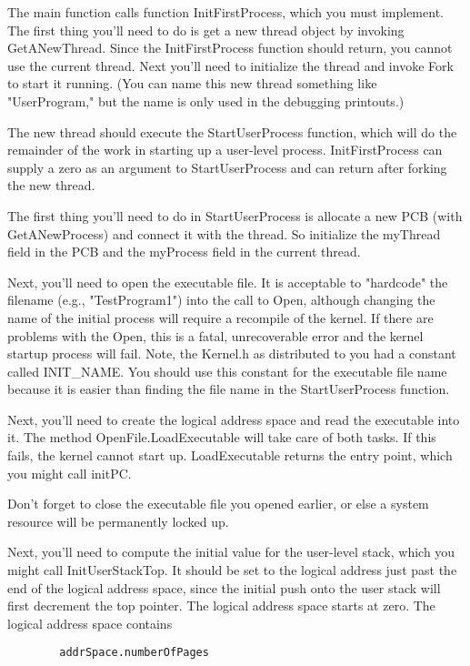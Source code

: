 \documentclass[12pt]{article}
\begin{document}
The main function calls function InitFirstProcess, which you must
implement.  The first thing you'll need to do is get a new thread
object by invoking GetANewThread.  Since the InitFirstProcess function
should return, you cannot use the current thread.  Next you'll need to
initialize the thread and invoke Fork to start it running.  (You can
name this new thread something like "UserProgram," but the name is
only used in the debugging printouts.)

The new thread should execute the StartUserProcess function, which
will do the remainder of the work in starting up a user-level process.
InitFirstProcess can supply a zero as an argument to StartUserProcess
and can return after forking the new thread.

The first thing you'll need to do in StartUserProcess is allocate a
new PCB (with GetANewProcess) and connect it with the thread.  So
initialize the myThread field in the PCB and the myProcess field in
the current thread.

Next, you'll need to open the executable file.  It is acceptable to
"hardcode" the filename (e.g., "TestProgram1") into the call to Open,
although changing the name of the initial process will require a
recompile of the kernel.  If there are problems with the Open, this is
a fatal, unrecoverable error and the kernel startup process will fail.
Note, the Kernel.h as distributed to you had a constant called
INIT\_NAME.  You should use this constant for the executable file
name because it is easier than finding the file name in the
StartUserProcess function.

Next, you'll need to create the logical address space and read the
executable into it.  The method OpenFile.LoadExecutable will take care
of both tasks.  If this fails, the kernel cannot start up.
LoadExecutable returns the entry point, which you might call initPC.

Don't forget to close the executable file you opened earlier, or else
a system resource will be permanently locked up.

Next, you'll need to compute the initial value for the user-level
stack, which you might call InitUserStackTop.  It should be set to the
logical address just past the end of the logical address space, since
the initial push onto the user stack will first decrement the top
pointer.  The logical address space starts at zero.  The logical
address space contains

\begin{verbatim}
        addrSpace.numberOfPages
\end{verbatim}
\end{document}
